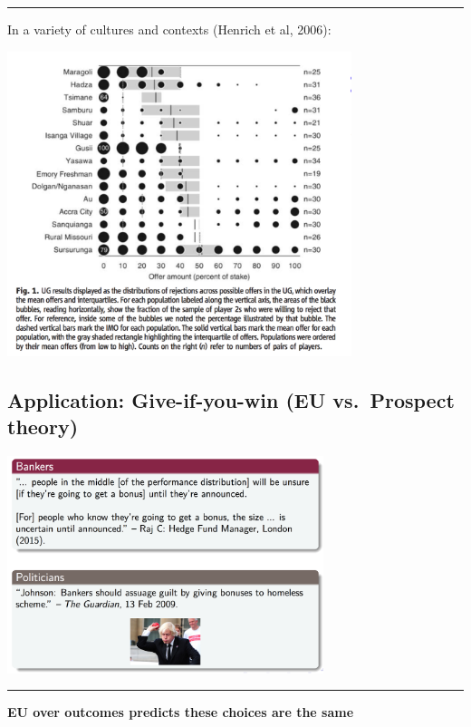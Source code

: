 \documentclass[]{article}
\begin{document}
\begin{center}\rule{0.5\linewidth}{\linethickness}\end{center}

In a variety of cultures and contexts (Henrich et al, 2006):

\includegraphics[height=3.5in]{picsfigs/ultimatumgameoffers_Science.png}

\hypertarget{application-give-if-you-win-eu-vs.-prospect-theory}{%
\subsection{Application: Give-if-you-win (EU vs.~Prospect theory)}\label{application-give-if-you-win-eu-vs.-prospect-theory}}

\includegraphics[height=2.5in]{picsfigs/borisbanks.png}

\begin{center}\rule{0.5\linewidth}{\linethickness}\end{center}

\textbf{EU over outcomes predicts these choices are the same}
\end{document}
